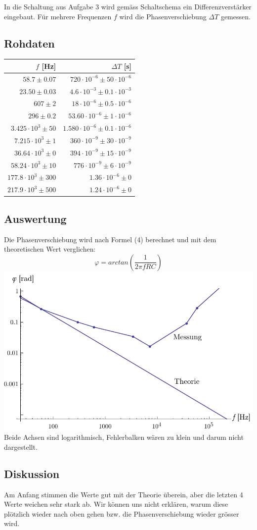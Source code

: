 \documentclass[12pt,a4paper]{article}
\begin{document}
\noindent
In die Schaltung aus Aufgabe 3 wird gem\"ass Schaltschema ein Differenzverst\"arker eingebaut. F\"ur mehrere Frequenzen $f$ wird die Phasenverschiebung $\Delta T$ gemessen.

\subsection*{Rohdaten}
\begin{tabular}{|r|r|}
\hline
$f$ [Hz]&$\Delta T$ [s]\\
\hline
$58.7 \pm 0.07$&$720\cdot 10^{-6} \pm 50\cdot 10^{-6}$\\
$23.50 \pm 0.03$&$4.6\cdot 10^{-3} \pm 0.1\cdot 10^{-3}$\\
$607 \pm 2$&$18\cdot 10^{-6} \pm 0.5\cdot 10^{-6}$\\
$296 \pm 0.2$&$53.60\cdot 10^{-6} \pm 1\cdot 10^{-6}$\\
$3.425\cdot 10^{3} \pm 50$&$1.580\cdot 10^{-6} \pm 0.1\cdot 10^{-6}$\\
$7.215\cdot 10^{3} \pm 1$&$360\cdot 10^{-9} \pm 30\cdot 10^{-9}$\\
$36.64\cdot 10^{3} \pm 0$&$394\cdot 10^{-9} \pm 15\cdot 10^{-9}$\\
$58.24\cdot 10^{3} \pm 10$&$776\cdot 10^{-9} \pm 6\cdot 10^{-9}$\\
$177.8\cdot 10^{3} \pm 300$&$1.36\cdot 10^{-6} \pm 0$\\
$217.9\cdot 10^{3} \pm 500$&$1.24\cdot 10^{-6} \pm 0$\\
\hline
\end{tabular}

\subsection*{Auswertung}
Die Phasenverschiebung wird nach Formel (4) berechnet und mit dem theoretischen Wert verglichen:
\[ \varphi = arctan\left( \frac{1}{2 \pi f R C} \right) \]
\includegraphics[width=14cm]{graph4.pdf}
Beide Achsen sind logarithmisch, Fehlerbalken w\"aren zu klein und darum nicht dargestellt. 

\subsection*{Diskussion}
Am Anfang stimmen die Werte gut mit der Theorie \"uberein, aber die letzten 4 Werte weichen sehr stark ab. Wir k\"onnen uns nicht erkl\"aren, warum diese pl\"otzlich wieder nach oben gehen bzw. die Phasenverschiebung wieder gr\"osser wird.
\end{document}
